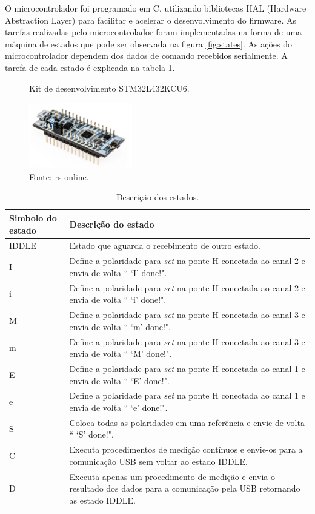 O microcontrolador foi programado em C, utilizando bibliotecas HAL (Hardware Abstraction Layer) para facilitar e acelerar o desenvolvimento do firmware. As tarefas realizadas pelo microcontrolador foram implementadas na forma de uma máquina de estados que pode ser observada na figura \ref{fig:states}. As ações do microcontrolador dependem dos dados de comando recebidos serialmente. A tarefa de cada estado é explicada na tabela \ref{tab:states}.


\begin{figure}[H]
    \centering
     \caption{Kit de desenvolvimento STM32L432KCU6.}
     \includegraphics[width=0.4\textwidth]{./img/imagensExplicacoes/armkit.png}
     \caption*{Fonte: rs-online.}
     \label{fig:kitArm}
\end{figure}

\begin{table}[H]
    \centering
    \caption{Descrição dos estados.}
    \begin{tabular}{|p{4cm}|p{10cm}|}
     \hline
     \textbf{Simbolo do estado} & \textbf{Descrição do estado} \\
     \hline
     IDDLE & Estado que aguarda o recebimento de outro estado. \\ \hline
     I &  Define a polaridade para \textit{set} na ponte H conectada ao canal 2 e envia de volta `` `I' done!". \\ \hline
     i & Define a polaridade para \textit{set} na ponte H conectada ao canal 2 e envia de volta `` `i' done!". \\ \hline
     M & Define a polaridade para \textit{set} na ponte H conectada ao canal 3 e envia de volta `` `m' done!". \\ \hline
     m & Define a polaridade para \textit{set} na ponte H conectada ao canal 3 e envia de volta `` `M' done!". \\ \hline
     E & Define a polaridade para \textit{set} na ponte H conectada ao canal 1 e envia de volta `` `E' done!". \\ \hline
     e & Define a polaridade para \textit{set} na ponte H conectada ao canal 1 e envia de volta `` `e' done!". \\ \hline
     S & Coloca todas as polaridades em uma referência e envie de volta `` `S' done!". \\ \hline
     C & Executa procedimentos de medição contínuos e envie-os para a comunicação USB sem voltar ao estado IDDLE.\\ \hline 
     D & Executa apenas um procedimento de medição e envia o resultado dos dados para a comunicação pela USB retornando as estado IDDLE.\\ \hline
     
    \end{tabular}
    \label{tab:states}
\end{table}

